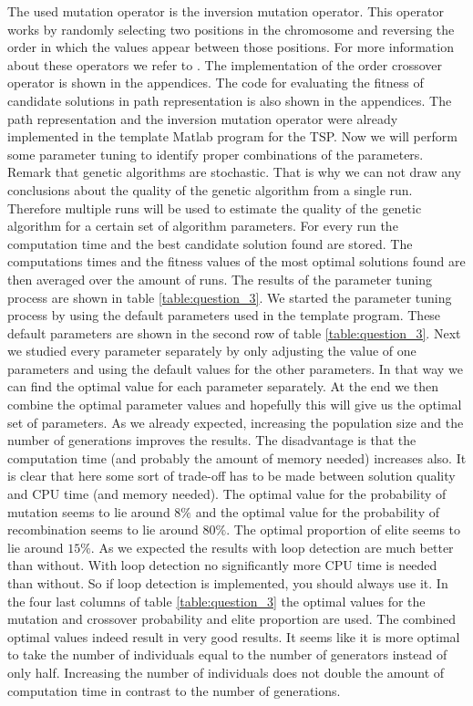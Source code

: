 The used mutation operator is the inversion mutation operator. This operator works by randomly selecting two positions in the chromosome and reversing the order in which the values appear between those positions. For more information about these operators we refer to \cite{handboek}. The implementation of the order crossover operator is shown in the appendices. The code for evaluating the fitness of candidate solutions in path representation is also shown in the appendices. The path representation and the inversion mutation operator were already implemented in the template Matlab program for the TSP.
\newline
\newline
Now we will perform some parameter tuning to identify proper combinations of the parameters. Remark that genetic algorithms are stochastic. That is why we can not draw any conclusions about the quality of the genetic algorithm from a single run. Therefore multiple runs will be used to estimate the quality of the genetic algorithm for a certain set of algorithm parameters. For every run the computation time and the best candidate solution found are stored. The computations times and the fitness values of the most optimal solutions found are then averaged over the amount of runs. The results of the parameter tuning process are shown in table \ref{table:question_3}.
\newline
\newline
We started the parameter tuning process by using the default parameters used in the template program. These default parameters are shown in the second row of table \ref{table:question_3}. Next we studied every parameter separately by only adjusting the value of one parameters and using the default values for the other parameters. In that way we can find the optimal value for each parameter separately. At the end we then combine the optimal parameter values and hopefully this will give us the optimal set of parameters. As we already expected, increasing the population size and the number of generations improves the results. The disadvantage is that the computation time (and probably the amount of memory needed) increases also. It is clear that here some sort of trade-off has to be made between solution quality and CPU time (and memory needed). The optimal value for the probability of mutation seems to lie around $8\%$ and the optimal value for the probability of recombination seems to lie around $80\%$. The optimal proportion of elite seems to lie around $15\%$. As we expected the results with loop detection are much better than without. With loop detection no significantly more CPU time is needed than without. So if loop detection is implemented, you should always use it.
\newline
\newline
In the four last columns of table \ref{table:question_3} the optimal values for the mutation and crossover probability and elite proportion are used. The combined optimal values indeed result in very good results. It seems like it is more optimal to take the number of individuals equal to the number of generators instead of only half. Increasing the number of individuals does not double the amount of computation time in contrast to the number of generations. 


